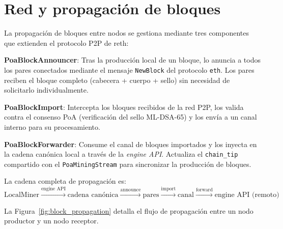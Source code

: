\section{Red y propagación de bloques}
\label{sec:dev_network}

La propagación de bloques entre nodos se gestiona mediante tres componentes que extienden el protocolo P2P de reth:

\textbf{PoaBlockAnnouncer}: Tras la producción local de un bloque, lo anuncia a todos los pares conectados mediante el mensaje \texttt{NewBlock} del protocolo \texttt{eth}. Los pares reciben el bloque completo (cabecera + cuerpo + sello) sin necesidad de solicitarlo individualmente.

\textbf{PoaBlockImport}: Intercepta los bloques recibidos de la red P2P, los valida contra el consenso PoA (verificación del sello ML-DSA-65) y los envía a un canal interno para su procesamiento.

\textbf{PoaBlockForwarder}: Consume el canal de bloques importados y los inyecta en la cadena canónica local a través de la \emph{engine API}. Actualiza el \texttt{chain\_tip} compartido con el \texttt{PoaMiningStream} para sincronizar la producción de bloques.

La cadena completa de propagación es:
\begin{equation*}
  \text{LocalMiner} \xrightarrow{\text{engine API}} \text{cadena canónica} \xrightarrow{\text{announce}} \text{pares}
  \xrightarrow{\text{import}} \text{canal} \xrightarrow{\text{forward}} \text{engine API (remoto)}
\end{equation*}

La Figura~\ref{fig:block_propagation} detalla el flujo de propagación entre un nodo productor y un nodo receptor.

